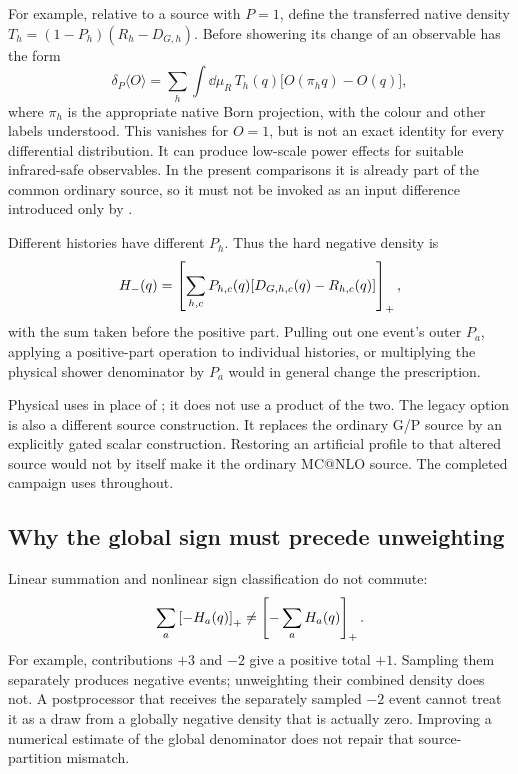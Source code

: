 For example, relative to a source with $P=1$, define the transferred native
density $T_h=(1-P_h)(R_h-D_{G,h})$. Before showering its change of an
observable has the form
\begin{equation}
 \delta_P\langle O\rangle
 =\sum_h\int\dd\mu_R\,T_h(q)
       \bigl[O(\pi_hq)-O(q)\bigr],
 \label{eq:source-bogusobservable}
\end{equation}
where $\pi_h$ is the appropriate native Born projection, with the colour
and other labels understood. This vanishes for $O=1$, but is not an exact
identity for every differential distribution. It can produce low-scale
power effects for suitable infrared-safe observables. In the present
comparisons it is already part of the common ordinary source, so it must
not be invoked as an input difference introduced only by \macnlops.

Different histories have different $P_h$. Thus the hard negative density
is
\begin{equation}
 H_-(q)=\left[\sum_{h,c}P_{h,c}(q)
                       [D_{G,h,c}(q)-R_{h,c}(q)]\right]_+,
 \label{eq:source-negativeglobal}
\end{equation}
with the sum taken before the positive part. Pulling out one event's
outer $P_a$, applying a positive-part operation to individual histories,
or multiplying the physical shower denominator by $P_a$ would in general
change the prescription.

Physical \DeltaMC{} uses  in place of
; it does not use a product of the two.
The legacy option  is also
a different source construction. It replaces the ordinary G/P source by
an explicitly gated scalar construction. Restoring an artificial profile
to that altered source would not by itself make it the ordinary MC@NLO
source. The completed campaign uses
 throughout.

\subsection{Why the global sign must precede unweighting}
\label{sec:source-sign}

Linear summation and nonlinear sign classification do not commute:
\begin{equation}
 \sum_a\left[-H_a(q)\right]_+\ne
 \left[-\sum_aH_a(q)\right]_+.
 \label{eq:source-signnonlinear}
\end{equation}
For example, contributions $+3$ and $-2$ give a positive total $+1$.
Sampling them separately produces negative events; unweighting their
combined density does not. A postprocessor that receives the separately
sampled $-2$ event cannot treat it as a draw from a globally negative
density that is actually zero. Improving a numerical estimate of the
global denominator does not repair that source-partition mismatch.

